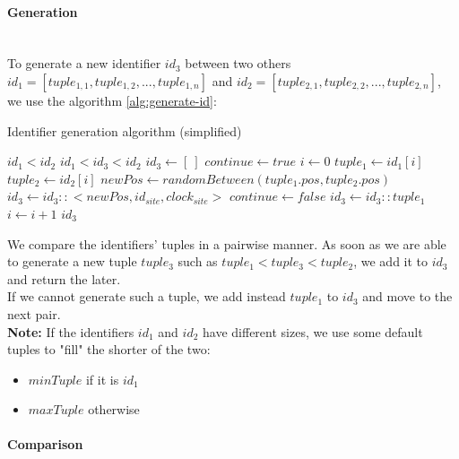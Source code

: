 \documentclass[a4paper]{article}
\begin{document}
\paragraph{Generation} ~\\

To generate a new identifier $id_3$ between two others
$id_1 = [tuple_{1,1}, tuple_{1,2},...,tuple_{1,n}]$ and
$id_2 = [tuple_{2,1}, tuple_{2,2},...,tuple_{2,n}]$,
we use the algorithm \ref{alg:generate-id}:


\begin{algorithm}
  \caption{Identifier generation algorithm (simplified)}\label{alg:generate-id}
  \begin{algorithmic}
      \Require $id_1 < id_2$
      \Ensure $id_1 < id_3 < id_2$
      \Statex
      \State $id_3 \gets [~]$
      \State $continue \gets true$
      \State $i \gets 0$
        \State $tuple_1 \gets id_1[i]$
        \State $tuple_2 \gets id_2[i]$
          \State $newPos \gets randomBetween(tuple_1.pos, tuple_2.pos)$
          \State $id_3 \gets id_3 :: <newPos, id_{site}, clock_{site}>$
          \State $continue \gets false$
        \Else
          \State $id_3 \gets id_3 :: tuple_1$
        \EndIf
        \State $i \gets i+1$
      \EndWhile
      \State \Return $id_3$
    \EndFunction
  \end{algorithmic}
\end{algorithm}


We compare the identifiers' tuples in a pairwise manner.
As soon as we are able to generate a new tuple $tuple_3$ such as $tuple_1 < tuple_3 < tuple_2$,
we add it to $id_3$ and return the later.
\\
If we cannot generate such a tuple,
we add instead $tuple_1$ to $id_3$ and move to the next pair.
\\
\textbf{Note:} If the identifiers $id_1$ and $id_2$ have different sizes,
we use some default tuples to "fill" the shorter of the two:
\begin{itemize}
  \item $minTuple$ if it is $id_1$
  \item $maxTuple$ otherwise
\end{itemize}

\paragraph{Comparison} ~\\
\end{document}
